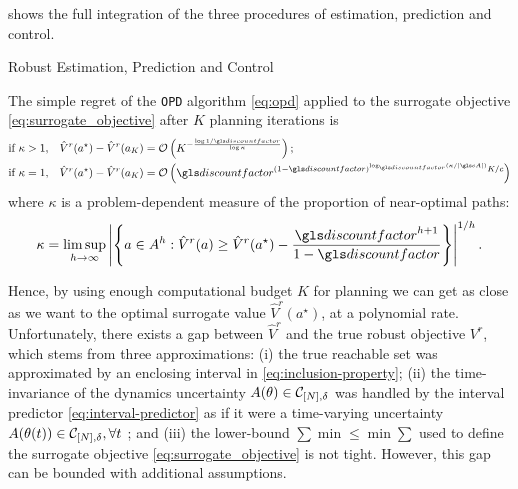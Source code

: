  shows the full integration of the three procedures of estimation, prediction and control. 
\begin{algorithm}[th]
	\caption{Robust Estimation, Prediction and Control}
	\label{alg:full}
\end{algorithm}

\begin{theorem}
	\label{theorem:opd-regret}
	\begin{leftbar}[theorembar]
	The simple regret of the \texttt{OPD} algorithm \eqref{eq:opd} applied to the surrogate objective \eqref{eq:surrogate_objective} after $K$ planning iterations is
	\begin{align*}
	\text{if } \kappa>1,\quad& 
	\hat{V}^r(a^{\star}) - \hat{V}^r({a_K}) = \cO\left(K^{-\frac{\log 1/\discount}{\log \kappa}}\right);\\
	\text{if }\kappa=1,\quad&
	\hat{V}^r(a^{\star}) - \hat{V}^r({a_K}) = \cO\left(\discount^{{(1-\discount)^{\log_\discount (\kappa/|\cA|)}}K/{c}}\right)
	\end{align*}
	where $\kappa$ is a problem-dependent measure of the proportion of near-optimal paths:
	\[
	\kappa = \limsup_{h\rightarrow\infty} \left|\left\{a\in A^h: \hat{V}^r(a)\geq \hat{V}^r(a^{\star}) - \frac{\discount^{h+1}}{1-\discount}\right\}\right|^{1/h}.
	\]
	\end{leftbar}
\end{theorem}

Hence, by using enough computational budget $K$ for planning we can get as close as we want to the optimal surrogate value $\hat{V}^r(a^{\star})$, at a polynomial rate. Unfortunately, there exists a gap between $\hat{V}^r$ and the true robust objective $V^r$, which stems from three approximations: (i) the true reachable set was approximated by an enclosing interval in \eqref{eq:inclusion-property}; (ii) the time-invariance of the dynamics uncertainty $A(\theta)\in\mathcal{C}_{[N],\delta}$ was handled by the interval predictor \eqref{eq:interval-predictor} as if it were a time-varying uncertainty $A(\theta(t))\in\mathcal{C}_{[N],\delta},\forall t$ ; and (iii) the lower-bound $\sum\min\leq \min\sum$ used to define the surrogate objective \eqref{eq:surrogate_objective} is not tight. However, this gap can be bounded with additional assumptions.

